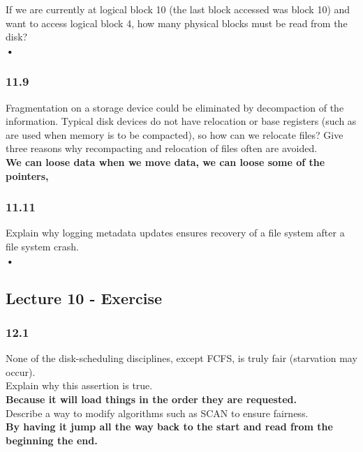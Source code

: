 \documentclass[a4paper,10pt,titlepage]{report}
\begin{document}
\hspace{10mm}If we are currently at logical block 10 (the last block accessed was block 10) and want to access logical block 4, how many physical blocks must be read from the disk?
\\
\hspace{15mm} \textbf{•} \\


\subsubsection{11.9}
Fragmentation on a storage device could be eliminated by decompaction of the information. Typical disk devices do not have relocation or base registers (such as are used when memory is to be compacted), so how can we relocate files? Give three reasons why recompacting and relocation of files often are avoided.\\
\hspace{15mm} \textbf{We can loose data when we move data, we can loose some of the pointers, } \\

\subsubsection{11.11}
Explain why logging metadata updates ensures recovery of a file system after a file system crash.\\
\hspace{15mm} \textbf{•} \\




\newpage
\subsection{Lecture 10 - Exercise}
\subsubsection{12.1} 
None of the disk-scheduling disciplines, except FCFS, is truly fair (starvation may occur). \\

\hspace{10mm} 	Explain why this assertion is true.\\
\hspace{15mm} \textbf{Because it will load things in the order they are requested.} \\


\hspace{10mm} 	Describe a way to modify algorithms such as SCAN to ensure fairness.\\
\hspace{15mm} \textbf{By having it jump all the way back to the start and read from the beginning the end.} \\
\end{document}
